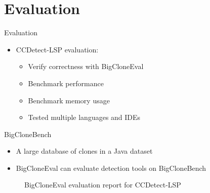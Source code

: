 \documentclass[aspectratio=1610, xcolor=table]{beamer}
\begin{document}
\section{Evaluation}
\begin{frame}{Evaluation}
    \begin{itemize}
        \item CCDetect-LSP evaluation:
            \begin{itemize}
                \item Verify correctness with BigCloneEval
                \item Benchmark performance
                \item Benchmark memory usage
                \item Tested multiple languages and IDEs
            \end{itemize}
    \end{itemize}
\end{frame}

\begin{frame}{BigCloneBench}
    \begin{itemize}
        \item A large database of clones in a Java dataset
        \item BigCloneEval can evaluate detection tools on BigCloneBench
    \end{itemize}
    \begin{figure}
    \begin{alltt}
        
    \end{alltt}
    \caption{BigCloneEval evaluation report for CCDetect-LSP}
    \label{bcblog}
\end{figure}
\end{frame}
\end{document}
